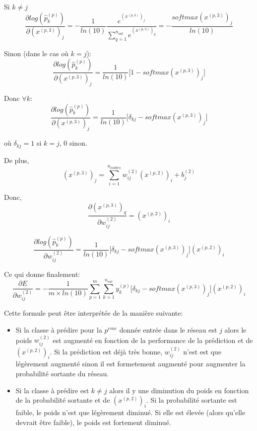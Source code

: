 \documentclass[a4paper,11pt,oneside,roman]{article}
\begin{document}
    Si $k \ne j$
    \begin{equation}
        \frac{\partial log(\hat{p}_{k}^{(p)})}{\partial (x^{(p,3)})_{j}} = -\frac{1}{ln(10)} \frac{e^{(x^{(p,3)})_j}}{\sum\limits_{q=1}^{n_{out}} e^{(x^{(p,3)})_q}} = -\frac{softmax(x^{(p,3)})_j}{ln(10)}
    \end{equation}

    Sinon (dans le cas où $k = j$):
    \begin{equation}
        \frac{\partial log(\hat{p}_{k}^{(p)})}{\partial (x^{(p,3)})_{j}} = \frac{1}{ln(10)} \bigg[ 1 - softmax(x^{(p,3)})_j \bigg]
    \end{equation}

    Donc $\forall k$:
    \begin{equation}
        \frac{\partial log(\hat{p}_{k}^{(p)})}{\partial (x^{(p,3)})_{j}} = \frac{1}{ln(10)} \bigg[ \delta_{kj} - softmax(x^{(p,3)})_j \bigg]
        \label{log_x3}
    \end{equation}
    
    où $ \delta_{kj} = 1$ si $k = j$, $0$ sinon.
    
    De plus,
    \begin{equation}
        (x^{(p,3)})_{j} = \sum\limits_{i=1}^{n_{hidden}} w_{ij}^{(2)}(x^{(p,2)})_i + b_j^{(2)}
    \end{equation}

    Donc,
    \begin{equation}
        \frac{\partial (x^{(p,3)})_{q}}{\partial w^{(2)}_{ij}} = (x^{(p,2)})_i
    \end{equation}

    \begin{equation}
        \frac{\partial log(\hat{p}_{k}^{(p)})}{\partial w^{(2)}_{ij}} = \frac{1}{ln(10)} \bigg[ \delta_{kj} - softmax(x^{(p,3)})_j \bigg] (x^{(p,2)})_{i}
    \end{equation}

    Ce qui donne finalement:
    \begin{equation}
        \frac{\partial E}{\partial w_{ij}^{(2)}} = -\frac{1}{m \times ln(10)} \sum\limits_{p=1}^{m} \sum\limits_{k=1}^{n_{out}} y_k^{(p)} \bigg[ \delta_{kj} - softmax(x^{(p,3)})_j \bigg] (x^{(p,2)})_{i}
    \end{equation}

    Cette formule peut être interprétée de la manière suivante:
    \begin{itemize}
        \item Si la classe à prédire pour la $p^{eme}$ donnée entrée dans le réseau est $j$ alors le poids $w_{ij}^{(2)}$ est augmenté en fonction de la performance de la prédiction et de $(x^{(p,2)})_{i}$.
        Si la prédiction est déjà très bonne, $w_{ij}^{(2)}$ n'est est que légèrement augmenté sinon il est formetement augmenté pour augmenter la probabilité sortante du réseau.
        \item Si la classe à prédire est $k \ne j$ alors il y une diminution du poids en fonction de la probabilité sortante et de $(x^{(p,2)})_{i}$. Si la probabilité sortante est faible, le poids n'est que légèrement diminué. Si elle est élevée (alors qu'elle devrait être faible), le poids est fortement diminué.
    \end{itemize}
\end{document}
